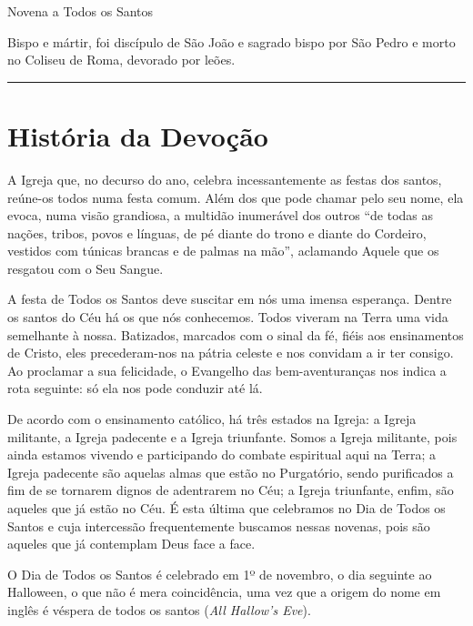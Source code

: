 \documentclass[a4paper,14pt]{extarticle} \usepackage[utf8]{inputenc}
\begin{document}
\begin{center}
  {\huge Novena a Todos os Santos}
\end{center}

Bispo e mártir, foi discípulo de São João e sagrado bispo por São Pedro e morto no Coliseu de Roma, devorado por leões.

\par\noindent\rule{\textwidth}{0.4pt}

\tableofcontents
\thispagestyle{empty}

\newpage

\section{História da Devoção}

A Igreja que, no decurso do ano, celebra incessantemente as festas dos santos, reúne-os todos numa festa comum. Além dos que pode chamar pelo seu nome, ela evoca, numa visão grandiosa, a multidão inumerável dos outros “de todas as nações, tribos, povos e línguas, de pé diante do trono e diante do Cordeiro, vestidos com túnicas brancas e de palmas na mão”, aclamando Aquele que os resgatou com o Seu Sangue.

A festa de Todos os Santos deve suscitar em nós uma imensa esperança. Dentre os santos do Céu há os que nós conhecemos. Todos viveram na Terra uma vida semelhante à nossa. Batizados, marcados com o sinal da fé, fiéis aos ensinamentos de Cristo, eles precederam-nos na pátria celeste e nos convidam a ir ter consigo. Ao proclamar a sua felicidade, o Evangelho das bem-aventuranças nos indica a rota seguinte: só ela nos pode conduzir até lá.

De acordo com o ensinamento católico, há três estados na Igreja: a Igreja militante, a Igreja padecente e a Igreja triunfante. Somos a Igreja militante, pois ainda estamos vivendo e participando do combate espiritual aqui na Terra; a Igreja padecente são aquelas almas que estão no Purgatório, sendo purificados a fim de se tornarem dignos de adentrarem no Céu; a Igreja triunfante, enfim, são aqueles que já estão no Céu. É esta última que celebramos no Dia de Todos os Santos e cuja intercessão frequentemente buscamos nessas novenas, pois são aqueles que já contemplam Deus face a face.

O Dia de Todos os Santos é celebrado em 1º de novembro, o dia seguinte ao Halloween, o que não é mera coincidência, uma vez que a origem do nome em inglês é véspera de todos os santos (\textit{All Hallow’s Eve}).
\end{document}
